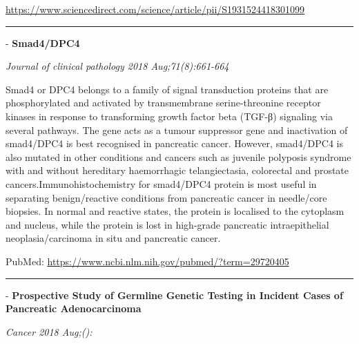 \documentclass[]{article}
\begin{document}
\url{https://www.sciencedirect.com/science/article/pii/S1931524418301099}

\begin{center}\rule{0.5\linewidth}{\linethickness}\end{center}

 - \textbf{Smad4/DPC4}

\emph{Journal of clinical pathology 2018 Aug;71(8):661-664}

Smad4 or DPC4 belongs to a family of signal transduction proteins that
are phosphorylated and activated by transmembrane serine-threonine
receptor kinases in response to transforming growth factor beta (TGF-β)
signaling via several pathways. The gene acts as a tumour suppressor
gene and inactivation of smad4/DPC4 is best recognised in pancreatic
cancer. However, smad4/DPC4 is also mutated in other conditions and
cancers such as juvenile polyposis syndrome with and without hereditary
haemorrhagic telangiectasia, colorectal and prostate
cancers.Immunohistochemistry for smad4/DPC4 protein is most useful in
separating benign/reactive conditions from pancreatic cancer in
needle/core biopsies. In normal and reactive states, the protein is
localised to the cytoplasm and nucleus, while the protein is lost in
high-grade pancreatic intraepithelial neoplasia/carcinoma in situ and
pancreatic cancer.

PubMed: \url{https://www.ncbi.nlm.nih.gov/pubmed/?term=29720405}

{}

{}

\begin{center}\rule{0.5\linewidth}{\linethickness}\end{center}

 - \textbf{Prospective Study of Germline Genetic Testing in Incident
Cases of Pancreatic Adenocarcinoma}

\emph{Cancer 2018 Aug;():}
\end{document}
